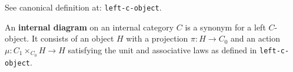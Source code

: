 See canonical definition at: \texttt{left-c-object}.

An \textbf{internal diagram} on an internal category $C$ is a synonym for a left $C$-object. It consists of an object $H$ with a projection $\pi : H \to C_0$ and an action $\mu : C_1 \times_{C_0} H \to H$ satisfying the unit and associative laws as defined in \texttt{left-c-object}.
